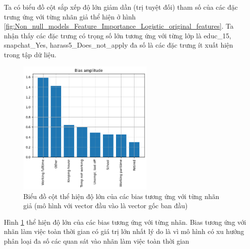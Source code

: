 \begin{enumerate}[label=(\alph*)]
    Ta có biểu đồ cột sắp xếp độ lớn giảm dần (trị tuyệt đối) tham số của các đặc trưng ứng với từng nhãn giả thể hiện ở hình \ref{fig:Non_null_models_Feature_Importance_Logistic_original_features}.
    Ta nhận thấy các đặc trưng có trọng số lớn tương ứng với từng lớp là educ\_15, snapchat\_Yes, harass5\_Does\_not\_apply đa số là các đặc trưng ít xuất hiện trong tập dữ liệu.

    \begin{figure}[H]
        \centering
        \includegraphics[width=0.6\textwidth]{figures/Thanh/Models/Logistic/Non_null_models_Bias_Importance_Logistic_original_features.png}
        \caption{Biểu đồ cột thể hiện độ lớn của các bias tương ứng với từng nhãn giả (mô hình với vector đầu vào là vector gốc ban đầu)}
        \label{fig:Non_null_models_Bias_Importance_Logistic_original_features.png}
    \end{figure}

    Hình \ref{fig:Non_null_models_Bias_Importance_Logistic_original_features.png} thể hiện độ lớn của các bias tương ứng với từng nhãn.
    Bias tương ứng với nhãn làm việc toàn thời gian có giá trị lớn nhất lý do là vì mô hình có xu hướng phân loại đa số các quan sát vào nhãn làm việc toàn thời gian
\end{enumerate}